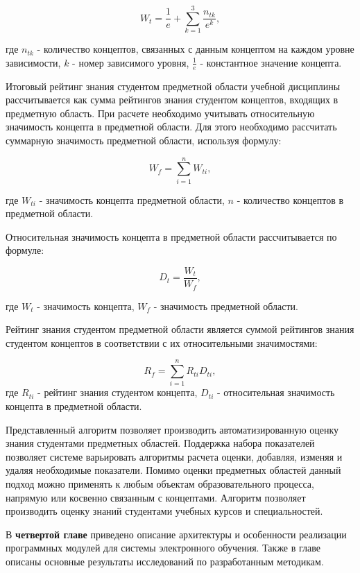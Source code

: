 $$
    W_t = \frac{1}{e}+\sum_{k=1}^{3}\frac{n_{tk}}{e^k}, 
$$

где \(n_{tk}\) - количество концептов, связанных с данным концептом на каждом уровне зависимости, \(k\) - номер зависимого уровня, \( \frac{1}{e} \) - константное значение концепта. 

Итоговый рейтинг знания студентом предметной области учебной дисциплины рассчитывается как сумма рейтингов знания студентом концептов, входящих в предметную область. При расчете необходимо учитывать относительную значимость концепта в предметной области. Для этого необходимо рассчитать суммарную значимость предметной области, используя формулу:

$$  
    W_f = \sum_{i=1}^{n}W_{ti},
$$

где \(W_{ti}\) - значимость концепта предметной области, \(n\) - количество концептов в предметной области.

Относительная значимость концепта в предметной области рассчитывается по формуле:

$$
    D_t = \frac{W_t}{W_f},
$$

где \(W_t\) - значимость концепта, \(W_f\) - значимость предметной области.

Рейтинг знания студентом предметной области является суммой рейтингов знания студентом концептов в соответствии с их относительными значимостями:

$$
    R_f = \sum_{i=1}^{n} R_{ti}D_{ti},
$$
где \(R_{ti}\) - рейтинг знания студентом концепта, \(D_{ti}\) - относительная значимость концепта в предметной области.

Представленный алгоритм позволяет производить автоматизированную оценку знания студентами предметных областей. Поддержка набора показателей позволяет системе варьировать алгоритмы расчета оценки, добавляя, изменяя и удаляя необходимые показатели. Помимо оценки предметных областей данный подход можно применять к любым объектам образовательного процесса, напрямую или косвенно связанным с концептами. Алгоритм позволяет производить оценку знаний студентами учебных курсов и специальностей.  

В \textbf{четвертой главе} приведено описание архитектуры и особенности реализации программных модулей для системы электронного обучения. Также в главе описаны основные результаты исследований по разработанным методикам.


